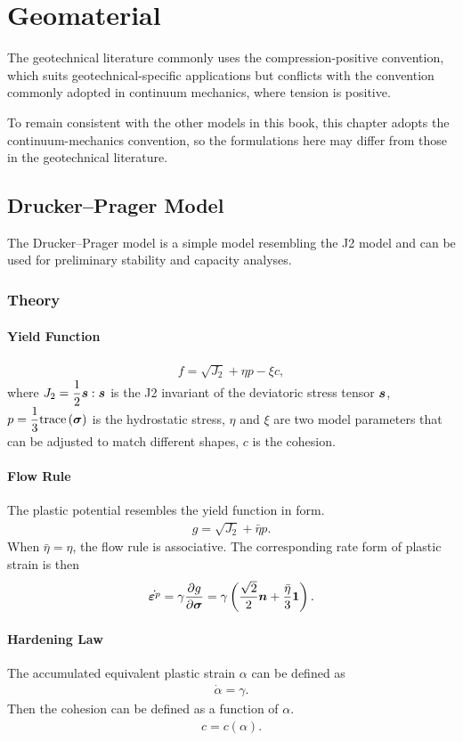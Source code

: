 \chapter{Geomaterial}
The geotechnical literature commonly uses the compression-positive convention, which suits geotechnical-specific applications but conflicts with the convention commonly adopted in continuum mechanics, where tension is positive.

To remain consistent with the other models in this book, this chapter adopts the continuum-mechanics convention, so the formulations here may differ from those in the geotechnical literature.
\section{Drucker--Prager Model}\label{sec:drucker_prager}
The Drucker--Prager model is a simple model resembling the J2 model and can be used for preliminary stability and capacity analyses.
\subsection{Theory}
\subsubsection{Yield Function}
\begin{gather}
f=\sqrt{J_2}+\eta{}p-\xi{}c,
\end{gather}
where $J_2=\dfrac{1}{2}\bm{s}:\bm{s}$ is the J2 invariant of the deviatoric stress tensor $\bm{s}$, $p=\dfrac{1}{3}\text{trace}\left(\bm{\sigma}\right)$ is the hydrostatic stress, $\eta$ and $\xi$ are two model parameters that can be adjusted to match different shapes, $c$ is the cohesion.
\subsubsection{Flow Rule}
The plastic potential resembles the yield function in form.
\begin{gather}
g=\sqrt{J_2}+\bar{\eta}p.
\end{gather}
When $\bar{\eta}=\eta$, the flow rule is associative.
The corresponding rate form of plastic strain is then
\begin{gather}
\dot{\bm{\varepsilon}^p}=\gamma\dfrac{\partial{g}}{\partial{\bm{\sigma}}}=\gamma\left(\dfrac{\sqrt{2}}{2}\bm{n}+\dfrac{\bar{\eta}}{3}\bm{1}\right).
\end{gather}
\subsubsection{Hardening Law}
The accumulated equivalent plastic strain $\alpha$ can be defined as
\begin{gather}
\dot{\alpha}=\gamma.
\end{gather}
Then the cohesion can be defined as a function of $\alpha$.
\begin{gather}
c=c\left(\alpha\right).
\end{gather}

